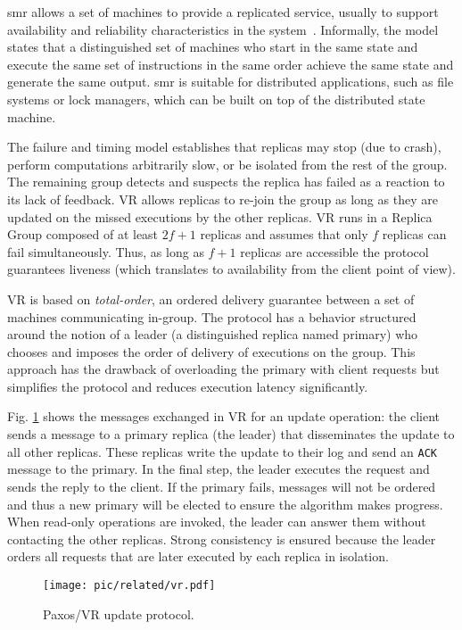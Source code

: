 \gls{smr} allows a set of machines to provide a replicated service, usually to support  availability and reliability characteristics in the system~\cite{Schneider:1990vy}.  
Informally,  the model states that a distinguished set of machines who start in the same state and execute the same set of instructions in the same order achieve the same state  and generate the same output. 
\gls{smr} is suitable for  distributed applications, such as  file systems or lock managers, which can  be built on top of the distributed state machine. 

The failure and timing model establishes that replicas may stop (due to crash), perform computations arbitrarily slow, or  be isolated from the rest of the group. 
The remaining  group detects and suspects the replica has failed as a reaction to its lack of feedback.
VR allows replicas to re-join the group as long as they are updated on the missed executions by the other replicas.
VR  runs in a Replica Group composed of at least $2f+1$ replicas and assumes that only $f$ replicas can fail simultaneously. 
Thus, as long as $f+1$ replicas are accessible the protocol guarantees liveness (which translates to availability from the client point of view). 

VR is based on  \emph{total-order}, an ordered delivery guarantee between a set of machines communicating in-group. 
The protocol has a behavior structured around the notion of a leader (a distinguished replica named primary) who chooses and imposes the order of delivery of executions on the group. 
This approach has the drawback of overloading the primary with client requests but  simplifies the protocol and reduces execution latency significantly. 


Fig. \ref{fig:paxos} shows the messages exchanged in VR for an update operation: the client sends a message to a primary replica (the leader) that disseminates the update to all other replicas. 
These replicas write the update to their log and send an \texttt{ACK} message to the primary.
In the final step, the leader executes the request and sends the reply to the client.
If the primary fails, messages will not be ordered and thus a new primary will be elected to ensure the algorithm makes progress.
When read-only operations are invoked, the leader can answer them without contacting the other replicas.
Strong consistency is ensured  because the leader orders all requests that are later executed by each replica in isolation. 


\begin{figure}[ht]
\centering
\texttt{[image: pic/related/vr.pdf]}
\caption[Paxos/VR update protocol]{Paxos/VR update protocol.} 
\label{fig:paxos} 
\end{figure}


